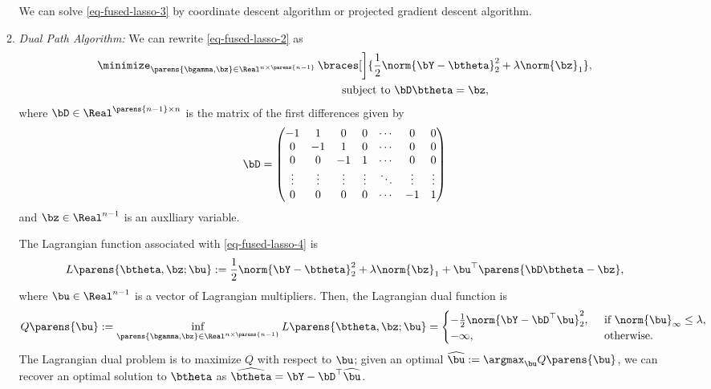 \documentclass[12pt]{article}
\begin{document}
\begin{enumerate}[label=\textbf{\arabic*.}]
\begin{enumerate}
		We can solve \eqref{eq-fused-lasso-3} by coordinate descent algorithm or projected gradient descent algorithm. 
		
		\item \textit{Dual Path Algorithm:} We can rewrite \eqref{eq-fused-lasso-2} as 
		\begin{equation}\label{eq-fused-lasso-4}
			\begin{aligned}
				\minimize_{\parens{\bgamma, \bz} \in \Real^{n \times \parens{n-1}}} & \, \braces[\bigg]{\frac{1}{2} \norm{\bY - \btheta}_2^2 + \lambda \norm{\bz}_1}, \\ 
				& \qquad \text{ subject to } \bD \btheta = \bz, 
			\end{aligned}
		\end{equation}
		where $\bD \in \Real^{\parens{n-1} \times n}$ is the matrix of the first differences given by 
		\begin{align*}
			\bD = \begin{pmatrix}
				-1 &  1 &  0 & 0  & \cdots & 0  & 0 \\ 
				0  & -1 &  1 & 0  & \cdots & 0  & 0 \\ 
				0  &  0 & -1 & 1  & \cdots & 0  & 0 \\ 
				\vdots & \vdots & \vdots & \vdots & \ddots & \vdots & \vdots \\ 
				0 & 0 & 0 & 0 & \cdots & -1 & 1 \\ 
			\end{pmatrix}
		\end{align*}
		and $\bz \in \Real^{n-1}$ is an auxlliary variable. 
		
		The Lagrangian function associated with \eqref{eq-fused-lasso-4} is 
		\begin{align*}
			L \parens{\btheta, \bz; \bu} := \frac{1}{2} \norm{\bY - \btheta}_2^2 + \lambda \norm{\bz}_1 + \bu^\top \parens{\bD \btheta - \bz}, 
		\end{align*}
		where $\bu \in \Real^{n-1}$ is a vector of Lagrangian multipliers. Then, the Lagrangian dual function is 
		\begin{align*}
			Q \parens{\bu} := \inf_{\parens{\bgamma, \bz} \in \Real^{n \times \parens{n-1}}} L \parens{\btheta, \bz; \bu} = \begin{cases}
				-\frac{1}{2} \norm{\bY - \bD^\top \bu}_2^2, & \, \text{ if } \norm{\bu}_{\infty} \le \lambda, \\ 
				-\infty, & \, \text{ otherwise.} 
			\end{cases}
		\end{align*}
		The Lagrangian dual problem is to maximize $Q$ with respect to $\bu$; given an optimal $\widehat{\bu} := \argmax_{\bu} Q \parens{\bu}$, we can recover an optimal solution to $\btheta$ as $\widehat{\btheta} = \bY - \bD^\top \widehat{\bu}$. 
	\end{enumerate}
	

\end{enumerate}
\end{document}
